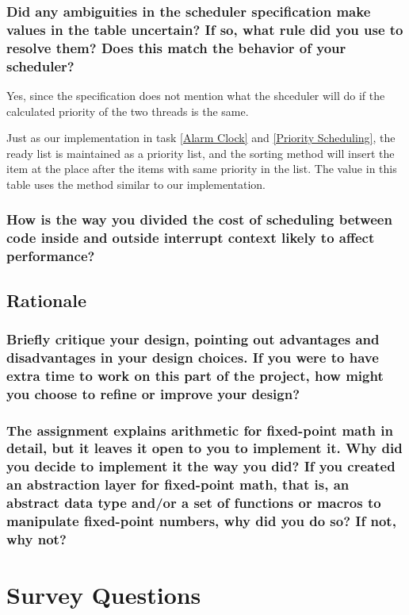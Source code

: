 \documentclass[sigconf, nonacm]{acmart}
\begin{document}
            \subsubsection{Did any ambiguities in the scheduler specification make values in the table uncertain? If so, what rule did you use to resolve them? Does this match the behavior of your scheduler? }

            Yes, since the specification does not mention what the shceduler will do if the calculated priority of the two threads is the same. 

            Just as our implementation in task \ref{Alarm Clock} and \ref{Priority Scheduling}, the ready list is maintained as a priority list, and the sorting method will insert the item at the place after the items with same priority in the list. The value in this table uses the method similar to our implementation. 

            \subsubsection{How is the way you divided the cost of scheduling between code inside and outside interrupt context likely to affect performance? }

        \subsection{Rationale}

            \subsubsection{Briefly critique your design, pointing out advantages and disadvantages in your design choices. If you were to have extra time to work on this part of the project, how might you choose to refine or improve your design? }

            \subsubsection{The assignment explains arithmetic for fixed-point math in detail, but it leaves it open to you to implement it. Why did you decide to implement it the way you did? If you created an abstraction layer for fixed-point math, that is, an abstract data type and/or a set of functions or macros to manipulate fixed-point numbers, why did you do so? If not, why not?}
    
    \section{Survey Questions}
\end{document}
